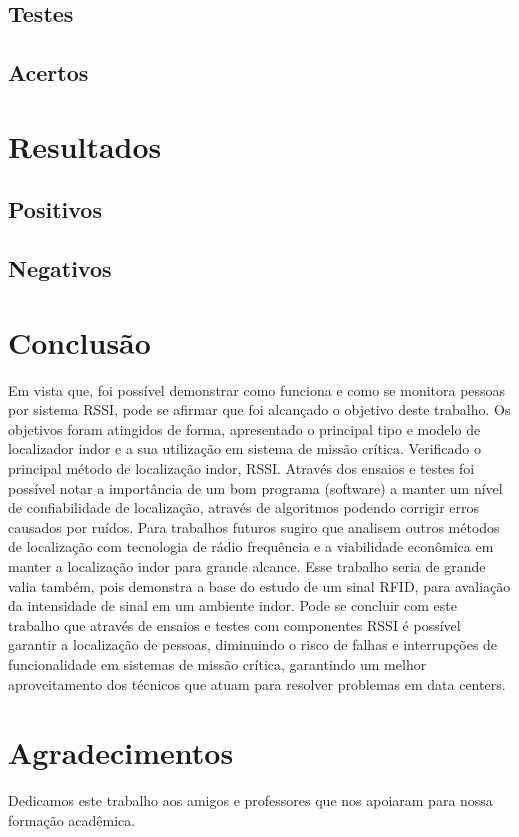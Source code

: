 \documentclass[
	article,			%
	12pt,				%
	oneside,			%
	a4paper,			%
	english,			%
	brazil,				%
	sumario=tradicional
	]{abntex2}
\begin{document}
\subsection{Testes}
\subsection{Acertos}

\section{Resultados}
\subsection{Positivos}
\subsection{Negativos}

\section{Conclusão}
Em vista que, foi possível demonstrar como funciona e como se monitora pessoas por sistema RSSI, pode se afirmar que foi alcançado o objetivo deste trabalho.
Os objetivos foram atingidos de forma, apresentado o principal tipo e modelo de localizador indor e a sua utilização em sistema de missão crítica. Verificado o principal método de localização indor, RSSI. Através dos ensaios e testes foi possível notar a importância de um bom programa (software) a manter um nível de confiabilidade de localização, através de algoritmos podendo corrigir erros causados por ruídos.
Para trabalhos futuros sugiro que analisem outros métodos de localização com tecnologia de rádio frequência e a viabilidade econômica em manter a localização indor para grande alcance. Esse trabalho seria de grande valia também, pois demonstra a base do estudo de um sinal RFID, para avaliação da intensidade de sinal em um ambiente indor.
Pode se concluir com este trabalho que através de ensaios e testes com componentes RSSI é possível garantir a localização de pessoas, diminuindo o risco de falhas e interrupções de funcionalidade em sistemas de missão crítica, garantindo um melhor aproveitamento dos técnicos que atuam para resolver problemas em data centers.

\section*{Agradecimentos}

Dedicamos este trabalho aos amigos e professores que nos apoiaram para nossa formação acadêmica.



\end{document}
